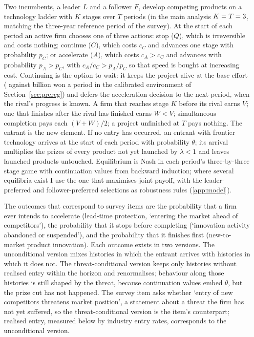 \documentclass[preprint,12pt,authoryear]{elsarticle}
\begin{document}
Two incumbents, a leader $L$ and a follower $F$, develop competing products on a technology ladder with $K$ stages over $T$ periods (in the main analysis $K = T = 3$, matching the three-year reference period of the survey). At the start of each period an active firm chooses one of three actions: stop ($Q$), which is irreversible and costs nothing; continue ($C$), which costs $c_C$ and advances one stage with probability $p_C$; or accelerate ($A$), which costs $c_A > c_C$ and advances with probability $p_A > p_C$, with $c_A/c_C > p_A/p_C$ so that speed is bought at increasing cost. Continuing is the option to wait: it keeps the project alive at the base effort (\EnvContinueCostBn{} against \EnvAccelCostBn{} billion won a period in the calibrated environment of Section~\ref{sec:prereg}) and defers the acceleration decision to the next period, when the rival's progress is known. A firm that reaches stage $K$ before its rival earns $V$; one that finishes after the rival has finished earns $W < V$; simultaneous completion pays each $(V + W)/2$; a project unfinished at $T$ pays nothing. The entrant is the new element. If no entry has occurred, an entrant with frontier technology arrives at the start of each period with probability $\theta$; its arrival multiplies the prizes of every product not yet launched by $\lambda < 1$ and leaves launched products untouched. Equilibrium is Nash in each period's three-by-three stage game with continuation values from backward induction; where several equilibria exist I use the one that maximises joint payoff, with the leader-preferred and follower-preferred selections as robustness rules (\ref{app:model}).

The outcomes that correspond to survey items are the probability that a firm ever intends to accelerate (lead-time protection, `entering the market ahead of competitors'), the probability that it stops before completing (`innovation activity abandoned or suspended'), and the probability that it finishes first (new-to-market product innovation). Each outcome exists in two versions. The unconditional version mixes histories in which the entrant arrives with histories in which it does not. The threat-conditional version keeps only histories without realised entry within the horizon and renormalises; behaviour along those histories is still shaped by the threat, because continuation values embed $\theta$, but the prize cut has not happened. The survey item asks whether `entry of new competitors threatens market position', a statement about a threat the firm has not yet suffered, so the threat-conditional version is the item's counterpart; realised entry, measured below by industry entry rates, corresponds to the unconditional version.
\end{document}
